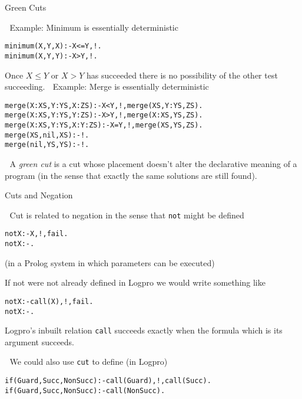 \documentclass{popl}
\newenvironment{smalltt}{\begin{alltt}\smaller}{\end{alltt}}
\begin{document}
\begin{foil} 
\begin{cframed}
Green Cuts
\end{cframed}

Example: Minimum is essentially deterministic
\begin{smalltt}
        minimum(X, Y, X) :- X<=Y, !.
        minimum(X, Y, Y) :- X>Y,  !.
\end{smalltt}
Once $X\leq Y$ or $X>Y$ has succeeded there is no possibility of the other test
succeeding. 

Example: Merge is essentially deterministic
\begin{smalltt}
        merge(X:XS, Y:YS, X:ZS)   :- X<Y, !, merge(XS,   Y:YS, ZS).
        merge(X:XS, Y:YS, Y:ZS)   :- X>Y, !, merge(X:XS, YS,   ZS).
        merge(X:XS, Y:YS, X:Y:ZS) :- X=Y, !, merge(XS,   YS,   ZS).
        merge(XS,   nil, XS)      :- !.
        merge(nil,  YS,   YS)     :- !.
\end{smalltt}

A {\it green cut} is a cut whose placement doesn't alter the 
declarative meaning of a program (in the sense that exactly the same
solutions are still found).
\end{foil}


\begin{foil} 
\begin{cframed}
 Cuts and Negation
\end{cframed}

Cut is related to negation in the sense that {\tt not} might be defined
\begin{smalltt}
        not X :- X, !, fail.
        not X :- .
\end{smalltt}
(in a Prolog system in which parameters can be executed)

If not were not already defined in Logpro we would write something like
\begin{smalltt}
        not X :- call(X), !, fail.
        not X :- .
\end{smalltt}
\begin{note}
Logpro's inbuilt relation {\tt call} succeeds exactly when the formula which is
its argument succeeds. 
\end{note}

We could also use {\tt cut} to define (in Logpro)
\begin{smalltt}
        if(Guard, Succ, NonSucc) :- call(Guard), !, call(Succ).
        if(Guard, Succ, NonSucc) :- call(NonSucc).
\end{smalltt}
\end{foil}
\end{document}
